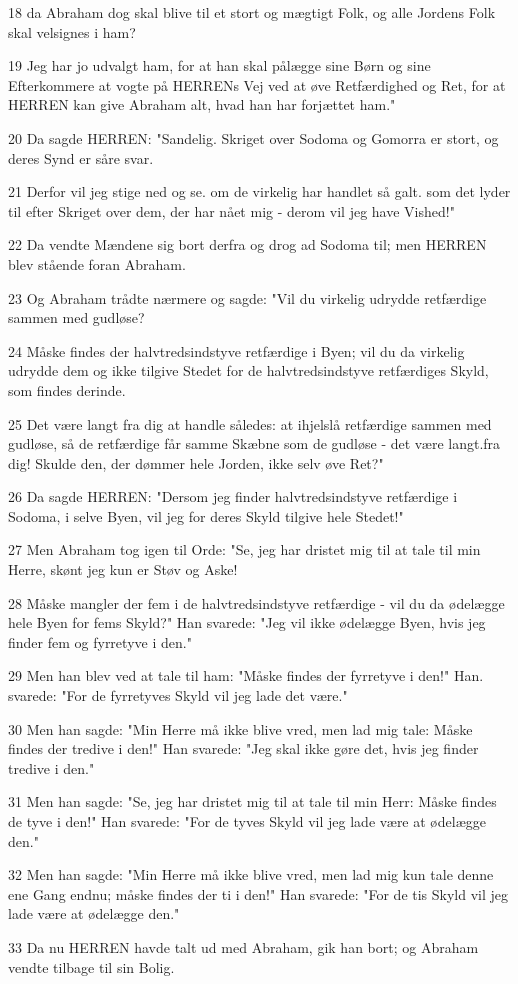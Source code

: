 \par 18 da Abraham dog skal blive til et stort og mægtigt Folk, og alle Jordens Folk skal velsignes i ham?
\par 19 Jeg har jo udvalgt ham, for at han skal pålægge sine Børn og sine Efterkommere at vogte på HERRENs Vej ved at øve Retfærdighed og Ret, for at HERREN kan give Abraham alt, hvad han har forjættet ham."
\par 20 Da sagde HERREN: "Sandelig. Skriget over Sodoma og Gomorra er stort, og deres Synd er såre svar.
\par 21 Derfor vil jeg stige ned og se. om de virkelig har handlet så galt. som det lyder til efter Skriget over dem, der har nået mig - derom vil jeg have Vished!"
\par 22 Da vendte Mændene sig bort derfra og drog ad Sodoma til; men HERREN blev stående foran Abraham.
\par 23 Og Abraham trådte nærmere og sagde: "Vil du virkelig udrydde retfærdige sammen med gudløse?
\par 24 Måske findes der halvtredsindstyve retfærdige i Byen; vil du da virkelig udrydde dem og ikke tilgive Stedet for de halvtredsindstyve retfærdiges Skyld, som findes derinde.
\par 25 Det være langt fra dig at handle således: at ihjelslå retfærdige sammen med gudløse, så de retfærdige får samme Skæbne som de gudløse - det være langt.fra dig! Skulde den, der dømmer hele Jorden, ikke selv øve Ret?"
\par 26 Da sagde HERREN: "Dersom jeg finder halvtredsindstyve retfærdige i Sodoma, i selve Byen, vil jeg for deres Skyld tilgive hele Stedet!"
\par 27 Men Abraham tog igen til Orde: "Se, jeg har dristet mig til at tale til min Herre, skønt jeg kun er Støv og Aske!
\par 28 Måske mangler der fem i de halvtredsindstyve retfærdige - vil du da ødelægge hele Byen for fems Skyld?" Han svarede: "Jeg vil ikke ødelægge Byen, hvis jeg finder fem og fyrretyve i den."
\par 29 Men han blev ved at tale til ham: "Måske findes der fyrretyve i den!" Han. svarede: "For de fyrretyves Skyld vil jeg lade det være."
\par 30 Men han sagde: "Min Herre må ikke blive vred, men lad mig tale: Måske findes der tredive i den!" Han svarede: "Jeg skal ikke gøre det, hvis jeg finder tredive i den."
\par 31 Men han sagde: "Se, jeg har dristet mig til at tale til min Herr: Måske findes de tyve i den!" Han svarede: "For de tyves Skyld vil jeg lade være at ødelægge den."
\par 32 Men han sagde: "Min Herre må ikke blive vred, men lad mig kun tale denne ene Gang endnu; måske findes der ti i den!" Han svarede: "For de tis Skyld vil jeg lade være at ødelægge den."
\par 33 Da nu HERREN havde talt ud med Abraham, gik han bort; og Abraham vendte tilbage til sin Bolig.

